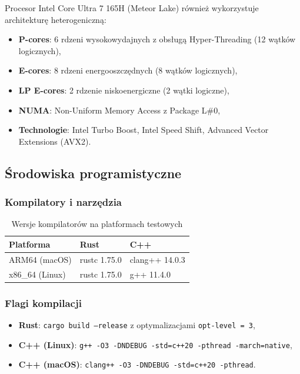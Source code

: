 Procesor Intel Core Ultra 7 165H (Meteor Lake) również wykorzystuje architekturę heterogeniczną:
\begin{itemize}
    \item \textbf{P-cores}: 6 rdzeni wysokowydajnych z obsługą Hyper-Threading (12 wątków logicznych),
    \item \textbf{E-cores}: 8 rdzeni energooszczędnych (8 wątków logicznych),
    \item \textbf{LP E-cores}: 2 rdzenie niskoenergiczne (2 wątki logiczne),
    \item \textbf{NUMA}: Non-Uniform Memory Access z Package L\#0,
    \item \textbf{Technologie}: Intel Turbo Boost, Intel Speed Shift, Advanced Vector Extensions (AVX2).
\end{itemize}

\subsection{Środowiska programistyczne}

\subsubsection{Kompilatory i narzędzia}

\begin{table}[h]
\centering
\caption{Wersje kompilatorów na platformach testowych}
\begin{tabular}{|l|l|l|}
\hline
\textbf{Platforma} & \textbf{Rust} & \textbf{C++} \\
\hline
ARM64 (macOS) & rustc 1.75.0 & clang++ 14.0.3 \\
x86\_64 (Linux) & rustc 1.75.0 & g++ 11.4.0 \\
\hline
\end{tabular}

\label{tab:compilers}
\end{table}

\subsubsection{Flagi kompilacji}
\begin{itemize}
    \item \textbf{Rust}: \texttt{cargo build --release} z optymalizacjami \texttt{opt-level = 3},
    \item \textbf{C++ (Linux)}: \texttt{g++ -O3 -DNDEBUG -std=c++20 -pthread -march=native},
    \item \textbf{C++ (macOS)}: \texttt{clang++ -O3 -DNDEBUG -std=c++20 -pthread}.
\end{itemize}
